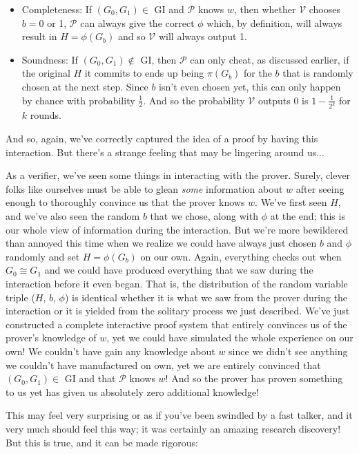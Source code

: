 		\begin{itemize}
			\item Completeness: If $(G_0,G_1)\in$ GI and $\mathcal{P}$ knows $w$, then whether $\mathcal{V}$ chooses $b=0$ or 1, $\mathcal{P}$ can always give the correct $\phi$ which, by definition, will always result in $H=\phi(G_b)$ and so $\mathcal{V}$ will always output 1.
			\item Soundness: If $(G_0,G_1)\notin$ GI, then $\mathcal{P}$ can only cheat, as discussed earlier, if the original $H$ it commits to ends up being $\pi(G_b)$ for the $b$ that is randomly chosen at the next step.  Since $b$ isn't even chosen yet, this can only happen by chance with probability $\frac{1}{2}$.  And so the probability $\mathcal{V}$ outputs 0 is $1-\frac{1}{2^k}$ for $k$ rounds.
		\end{itemize}
		
		And so, again, we've correctly captured the idea of a proof by having this interaction.  But there's a strange feeling that may be lingering around us...
		
		As a verifier, we've seen some things in interacting with the prover.  Surely, clever folks like ourselves must be able to glean \textit{some} information about $w$ after seeing enough to thoroughly convince us that the prover knows $w$.  We've first seen $H$, and we've also seen the random $b$ that we chose, along with $\phi$ at the end;  this is our whole view of information during the interaction.  But we're more bewildered than annoyed this time when we realize we could have always just chosen $b$ and $\phi$ randomly and set $H=\phi(G_b)$ on our own.  Again, everything checks out when $G_0 \cong G_1$ and we could have produced everything that we saw during the interaction before it even began.  That is, the distribution of the random variable triple ($H$, $b$, $\phi$) is identical whether it is what we saw from the prover during the interaction or it is yielded from the solitary process we just described.  We've just constructed a complete interactive proof system that entirely convinces us of the prover's knowledge of $w$, yet we could have simulated the whole experience on our own!  We couldn't have gain any knowledge about $w$ since we didn't see anything we couldn't have manufactured on own, yet we are entirely convinced that $(G_0,G_1)\in$ GI and that $\mathcal{P}$ knows $w$!  And so the prover has proven something to us yet has given us absolutely zero additional knowledge!
		
		This may feel very surprising or as if you've been swindled by a fast talker, and it very much should feel this way; it was certainly an amazing research discovery!  But this is true, and it can be made rigorous:
		
